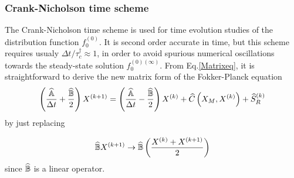 \subsubsection{Crank-Nicholson time scheme}

The Crank-Nicholson time scheme is used for time evolution studies of the
distribution function $f_{0}^{\left( 0\right) }$. It is second order
accurate in time, but this scheme requires usualy $\Delta t/\tau
_{c}^{\dagger }\approx 1$, in order to avoid spurious numerical oscillations
towards the steady-state solution $f_{0}^{\left( 0\right) \left( \infty
\right) }.$ From Eq.\ref{Matrixeq}, it is straightforward to derive the new
matrix form of the Fokker-Planck equation
\begin{equation}
\left( \frac{\widehat{\Bbb{A}}}{\Delta t}+\frac{\widehat{\Bbb{B}}}{2}\right)
X^{(k+1)}=\left( \frac{\widehat{\Bbb{A}}}{\Delta t}-\frac{\widehat{\Bbb{B}}}{%
2}\right) X^{(k)}+\widehat{C}\left( X_{M},X^{(k)}\right) +\widehat{S}%
_{R}^{(k)}
\end{equation}
by just replacing

\begin{equation}
\widehat{\Bbb{B}}X^{(k+1)}\rightarrow \widehat{\Bbb{B}}\left( \frac{%
X^{(k)}+X^{(k+1)}}{2}\right)
\end{equation}
since $\widehat{\Bbb{B}}$ is a linear operator.
